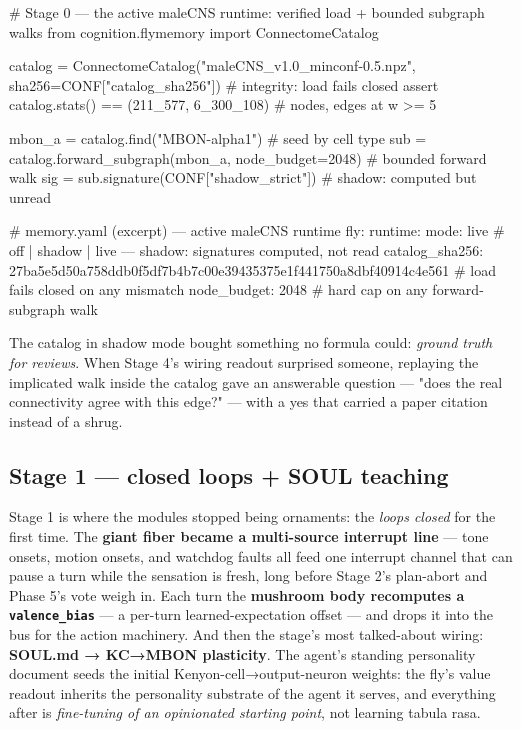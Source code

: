 \documentclass[11pt]{article}
\begin{document}
\begin{CodeBlock}
# Stage 0 — the active maleCNS runtime: verified load + bounded subgraph walks
from cognition.flymemory import ConnectomeCatalog

catalog = ConnectomeCatalog("maleCNS_v1.0_minconf-0.5.npz",
                            sha256=CONF["catalog_sha256"])  # integrity: load fails closed
assert catalog.stats() == (211_577, 6_300_108)              # nodes, edges at w >= 5

mbon_a = catalog.find("MBON-alpha1")                        # seed by cell type
sub = catalog.forward_subgraph(mbon_a, node_budget=2048)    # bounded forward walk
sig = sub.signature(CONF["shadow_strict"])                  # shadow: computed but unread
\end{CodeBlock}

\begin{CodeBlock}
# memory.yaml (excerpt) — active maleCNS runtime
fly:
  runtime:
    mode: live               # off | shadow | live — shadow: signatures computed, not read
    catalog_sha256: 27ba5e5d50a758ddb0f5df7b4b7c00e39435375e1f441750a8dbf40914c4e561  # load fails closed on any mismatch
    node_budget: 2048        # hard cap on any forward-subgraph walk
\end{CodeBlock}

The catalog in shadow mode bought something no formula could: \emph{ground truth for reviews}. When Stage 4's wiring readout surprised someone, replaying the implicated walk inside the catalog gave an answerable question — "does the real connectivity agree with this edge?" — with a yes that carried a paper citation instead of a shrug.

\subsection{Stage 1 — closed loops + SOUL teaching}

Stage 1 is where the modules stopped being ornaments: the \emph{loops closed} for the first time. The \textbf{giant fiber became a multi-source interrupt line} — tone onsets, motion onsets, and watchdog faults all feed one interrupt channel that can pause a turn while the sensation is fresh, long before Stage 2's plan-abort and Phase 5's vote weigh in. Each turn the \textbf{mushroom body recomputes a \texttt{valence\_bias}} — a per-turn learned-expectation offset — and drops it into the bus for the action machinery. And then the stage's most talked-about wiring: \textbf{SOUL.md → KC→MBON plasticity}. The agent's standing personality document seeds the initial Kenyon-cell→output-neuron weights: the fly's value readout inherits the personality substrate of the agent it serves, and everything after is \emph{fine-tuning of an opinionated starting point}, not learning tabula rasa.
\end{document}
